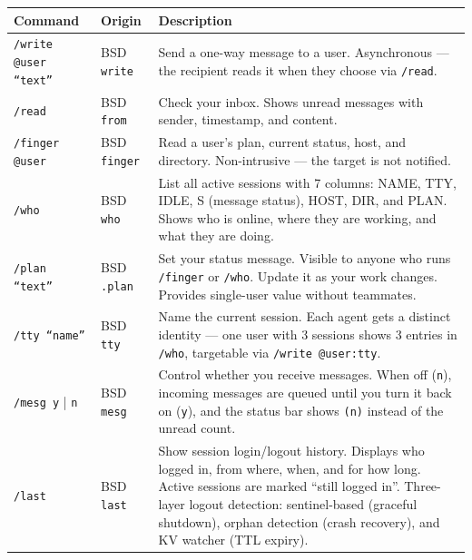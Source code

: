 \documentclass[11pt,letterpaper]{article}
\begin{document}
\renewcommand{\arraystretch}{1.4}
\begin{tabularx}{\textwidth}{@{}l l X@{}}
  \toprule
  \textbf{Command} & \textbf{Origin} & \textbf{Description} \\
  \midrule

  \texttt{/write @user ``text''} & BSD \texttt{write} &
  Send a one-way message to a user. Asynchronous --- the recipient reads
  it when they choose via \texttt{/read}. \\

  \texttt{/read} & BSD \texttt{from} &
  Check your inbox. Shows unread messages with sender, timestamp, and
  content. \\

  \texttt{/finger @user} & BSD \texttt{finger} &
  Read a user's plan, current status, host, and directory.
  Non-intrusive --- the target is not notified. \\

  \texttt{/who} & BSD \texttt{who} &
  List all active sessions with 7 columns: NAME, TTY, IDLE, S (message
  status), HOST, DIR, and PLAN. Shows who is online, where they are
  working, and what they are doing. \\

  \texttt{/plan ``text''} & BSD \texttt{.plan} &
  Set your status message. Visible to anyone who runs \texttt{/finger}
  or \texttt{/who}. Update it as your work changes. Provides single-user
  value without teammates. \\

  \texttt{/tty ``name''} & BSD \texttt{tty} &
  Name the current session. Each agent gets a distinct identity ---
  one user with 3 sessions shows 3 entries in \texttt{/who}, targetable
  via \texttt{/write @user:tty}. \\

  \texttt{/mesg y} | \texttt{n} & BSD \texttt{mesg} &
  Control whether you receive messages. When off (\texttt{n}), incoming
  messages are queued until you turn it back on (\texttt{y}), and the
  status bar shows \texttt{(n)} instead of the unread count. \\

  \texttt{/last} & BSD \texttt{last} &
  Show session login/logout history. Displays who logged in, from where,
  when, and for how long. Active sessions are marked ``still logged in''.
  Three-layer logout detection: sentinel-based (graceful shutdown),
  orphan detection (crash recovery), and KV watcher (TTL expiry). \\


\end{tabularx}
\end{document}
